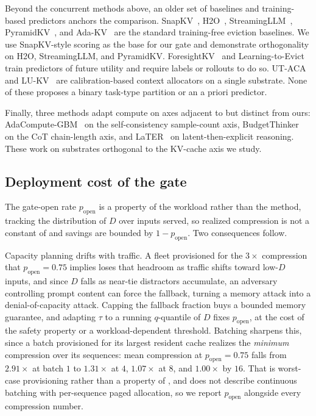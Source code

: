 Beyond the concurrent methods above, an older set of baselines and training-based
predictors anchors the comparison. SnapKV~\citep{arxiv240414469},
H2O~\citep{arxiv230614048}, StreamingLLM~\citep{arxiv230917453},
PyramidKV~\citep{arxiv240602069}, and Ada-KV~\citep{arxiv240711550} are the
standard training-free eviction baselines. We use SnapKV-style scoring as
the base for our gate and demonstrate orthogonality on H2O, StreamingLLM,
and PyramidKV. ForesightKV~\citep{arxiv260203203} and
Learning-to-Evict~\citep{arxiv260210238} train predictors of future
utility and require labels or rollouts to do so. UT-ACA~%
\citep{arxiv260318446} and LU-KV~\citep{arxiv260208585} are
calibration-based context allocators on a single substrate. None of these
proposes a binary task-type partition or an a priori predictor.

Finally, three methods adapt compute on axes adjacent to but distinct
from ours: AdaCompute-GBM~\citep{arxiv260414853} on the self-consistency
sample-count axis, BudgetThinker~\citep{arxiv250817196} on the CoT
chain-length axis, and LaTER~\citep{arxiv260507315} on latent-then-explicit
reasoning. These work on substrates orthogonal to the KV-cache axis we
study.

\subsection{Deployment cost of the gate}
\label{subsec:deployment}

The gate-open rate $p_{\text{open}}$ is a property of the workload rather than
the method, tracking the distribution of $D$ over inputs served, so realized
compression is not a constant of \method and savings are bounded by $1 -
p_{\text{open}}$. Two consequences follow.

Capacity planning drifts with traffic. A fleet provisioned for the $3\times$
compression that $p_{\text{open}} = 0.75$ implies loses that headroom as
traffic shifts toward low-$D$ inputs, and since $D$ falls as near-tie
distractors accumulate, an adversary controlling prompt content can force the
fallback, turning a memory attack into a denial-of-capacity attack. Capping
the fallback fraction buys a bounded memory guarantee, and adapting $\tau$ to
a running $q$-quantile of $D$ fixes $p_{\text{open}}$, at the cost of the
safety property or a workload-dependent threshold. Batching sharpens this,
since a batch provisioned for its largest resident cache realizes the
\emph{minimum} compression over its sequences: mean compression at
$p_{\text{open}} = 0.75$ falls from $2.91\times$ at batch $1$ to $1.31\times$
at $4$, $1.07\times$ at $8$, and $1.00\times$ by $16$. That is worst-case
provisioning rather than a property of \method, and does not describe
continuous batching with per-sequence paged allocation, so we report
$p_{\text{open}}$ alongside every compression number.



